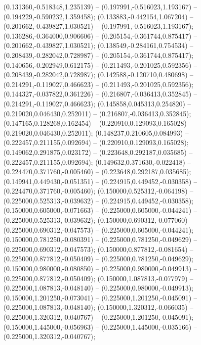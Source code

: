 (0.131360,-0.518348,1.235139) -- (0.197991,-0.516023,1.193167) -- (0.194229,-0.590232,1.359458);
 (0.133883,-0.442154,1.067204) -- (0.201662,-0.439827,1.030521) -- (0.197991,-0.516023,1.193167);
 (0.136286,-0.364000,0.906606) -- (0.205154,-0.361744,0.875417) -- (0.201662,-0.439827,1.030521);
 (0.138549,-0.284161,0.754534) -- (0.208439,-0.282042,0.728987) -- (0.205154,-0.361744,0.875417);
 (0.140656,-0.202949,0.612175) -- (0.211493,-0.201025,0.592356) -- (0.208439,-0.282042,0.728987);
 (0.142588,-0.120710,0.480698) -- (0.214291,-0.119027,0.466623) -- (0.211493,-0.201025,0.592356);
 (0.144327,-0.037822,0.361226) -- (0.216807,-0.036413,0.352845) -- (0.214291,-0.119027,0.466623);
 (0.145858,0.045313,0.254820) -- (0.219020,0.046430,0.252011) -- (0.216807,-0.036413,0.352845);
 (0.147165,0.128268,0.162454) -- (0.220910,0.129093,0.165028) -- (0.219020,0.046430,0.252011);
 (0.148237,0.210605,0.084993) -- (0.222457,0.211155,0.092694) -- (0.220910,0.129093,0.165028);
 (0.149062,0.291875,0.023172) -- (0.223648,0.292187,0.035685) -- (0.222457,0.211155,0.092694);
 (0.149632,0.371630,-0.022418) -- (0.224470,0.371760,-0.005460) -- (0.223648,0.292187,0.035685);
 (0.149941,0.449430,-0.051351) -- (0.224915,0.449452,-0.030358) -- (0.224470,0.371760,-0.005460);
 (0.150000,0.525312,-0.064198) -- (0.225000,0.525313,-0.039632) -- (0.224915,0.449452,-0.030358);
 (0.150000,0.605000,-0.071663) -- (0.225000,0.605000,-0.044241) -- (0.225000,0.525313,-0.039632);
 (0.150000,0.690312,-0.077060) -- (0.225000,0.690312,-0.047573) -- (0.225000,0.605000,-0.044241);
 (0.150000,0.781250,-0.080391) -- (0.225000,0.781250,-0.049629) -- (0.225000,0.690312,-0.047573);
 (0.150000,0.877812,-0.081654) -- (0.225000,0.877812,-0.050409) -- (0.225000,0.781250,-0.049629);
 (0.150000,0.980000,-0.080850) -- (0.225000,0.980000,-0.049913) -- (0.225000,0.877812,-0.050409);
 (0.150000,1.087813,-0.077979) -- (0.225000,1.087813,-0.048140) -- (0.225000,0.980000,-0.049913);
 (0.150000,1.201250,-0.073041) -- (0.225000,1.201250,-0.045091) -- (0.225000,1.087813,-0.048140);
 (0.150000,1.320312,-0.066035) -- (0.225000,1.320312,-0.040767) -- (0.225000,1.201250,-0.045091);
 (0.150000,1.445000,-0.056963) -- (0.225000,1.445000,-0.035166) -- (0.225000,1.320312,-0.040767);

